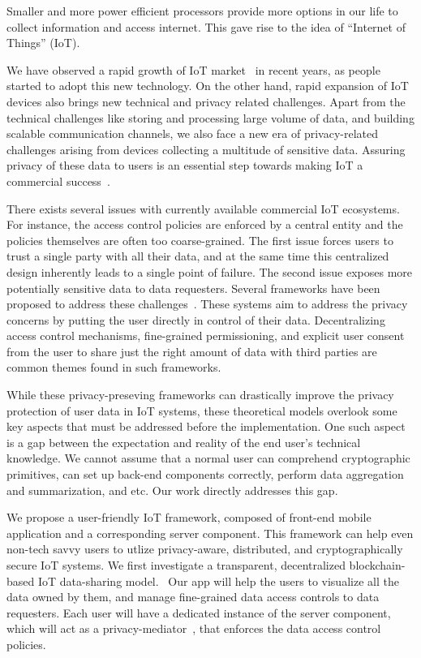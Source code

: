 Smaller and more power efficient processors provide more options in our life to collect information and access internet. This gave rise to the idea of ``Internet of Things'' (IoT).

We have observed a rapid growth of IoT market~\cite{idc} in recent years, as people started to adopt this new technology. On the other hand, rapid expansion of IoT devices also brings new technical and privacy related challenges. Apart from the technical challenges like storing and processing large volume of data, and building scalable communication channels, we also face a new era of privacy-related challenges arising from devices collecting a multitude of sensitive data. Assuring privacy of these data to users is an essential step towards making IoT a commercial success~\cite{davies}.

There exists several issues with currently available commercial IoT ecosystems. For instance, the access control policies are enforced by a central entity and the policies themselves are often too coarse-grained. The first issue forces users to trust a single party with all their data, and at the same time this centralized design inherently leads to a single point of failure. The second issue exposes more potentially sensitive data  to data requesters. Several frameworks have been proposed to address these challenges~\cite{campbell,davies}. These systems aim to address the privacy concerns by putting the user directly in control of their data. Decentralizing access control mechanisms, fine-grained permissioning, and explicit user consent from the user to share just the right amount of data with third parties are common themes found in such frameworks.

While these privacy-preseving frameworks can drastically improve the privacy protection of user data in IoT systems, these theoretical models overlook some key aspects that must be addressed before the implementation. One such aspect is a gap between the expectation and reality of the end user's technical knowledge. We cannot assume that a normal user can comprehend cryptographic primitives, can set up back-end components correctly, perform data aggregation and summarization, and etc. Our work directly addresses this gap.

We propose a user-friendly IoT framework, composed of front-end mobile application and a corresponding server component. This framework can help even non-tech savvy users to  utlize privacy-aware, distributed, and cryptographically secure IoT systems. We first investigate a transparent, decentralized blockchain-based IoT data-sharing model.~\cite{campbell} Our app will help the users to visualize all the data owned by them, and manage fine-grained data access controls to data requesters. Each user will have a dedicated instance of the server component, which will act as a privacy-mediator~\cite{davies}, that enforces the data access control policies.

